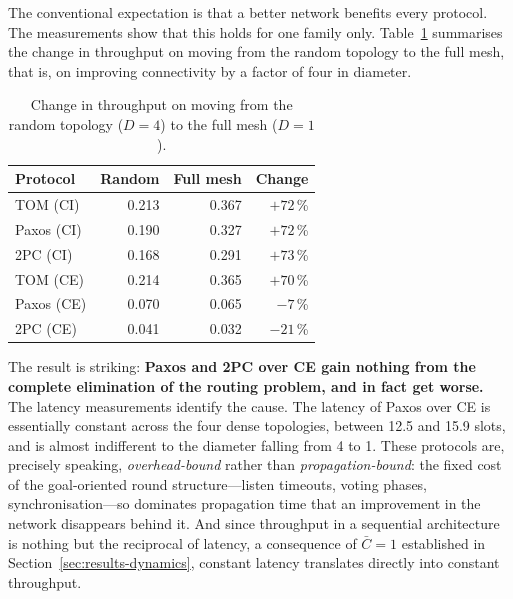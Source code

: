 \documentclass[journal]{IEEEtran}
\newcommand{\CI}{CI}                      %
\newcommand{\CE}{CE}                      %
\newcommand{\Nnodes}{N}                   %
\newcommand{\Diam}{D}                     %
\newcommand{\Cdepth}{\bar{C}}             %
\begin{document}

The conventional expectation is that a better network benefits every
protocol. The measurements show that this holds for one family only.
Table~\ref{tab:diameter} summarises the change in throughput on moving
from the random topology to the full mesh, that is, on improving
connectivity by a factor of four in diameter.

\begin{table}[!t]
\caption{Change in throughput on moving from the random topology
($\Diam = 4$) to the full mesh ($\Diam = 1$).}
\label{tab:diameter}
\centering
\footnotesize
\begin{tabular}{@{}lrrr@{}}
\toprule
\textbf{Protocol} & \textbf{Random} & \textbf{Full mesh} &
\textbf{Change} \\
\midrule
TOM (\CI)   & 0.213 & 0.367 & $+72$\,\% \\
Paxos (\CI) & 0.190 & 0.327 & $+72$\,\% \\
2PC (\CI)   & 0.168 & 0.291 & $+73$\,\% \\
\addlinespace
TOM (\CE)   & 0.214 & 0.365 & $+70$\,\% \\
Paxos (\CE) & 0.070 & 0.065 & $-7$\,\% \\
2PC (\CE)   & 0.041 & 0.032 & $-21$\,\% \\
\bottomrule
\end{tabular}
\end{table}

The result is striking: \textbf{Paxos and 2PC over \CE{} gain nothing
from the complete elimination of the routing problem, and in fact get
worse.} The latency measurements identify the cause. The latency of Paxos
over \CE{} is essentially constant across the four dense topologies,
between 12.5 and 15.9 slots, and is almost indifferent to the diameter
falling from 4 to 1. These protocols are, precisely speaking,
\emph{overhead-bound} rather than \emph{propagation-bound}: the fixed cost
of the goal-oriented round structure---listen timeouts, voting phases,
synchronisation---so dominates propagation time that an improvement in the
network disappears behind it. And since throughput in a sequential
architecture is nothing but the reciprocal of latency, a consequence of
$\Cdepth = 1$ established in Section~\ref{sec:results-dynamics}, constant
latency translates directly into constant throughput.
\end{document}
